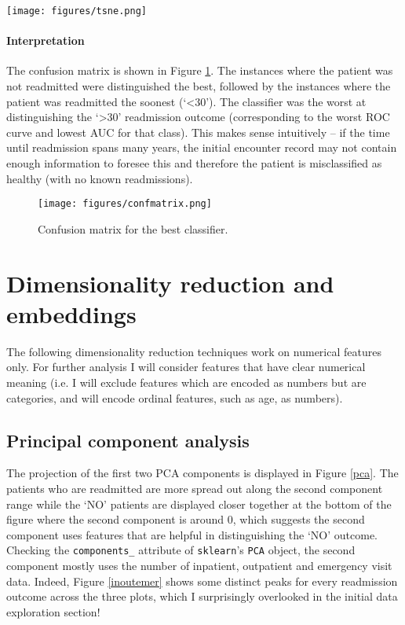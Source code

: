 \documentclass[10pt, twocolumn]{article}
\begin{document}
\begin{figure*}[b]
	\centering
	\texttt{[image: figures/tsne.png]}
	\caption{t-SNE embeddings of the diabetic patient dataset for selected perplexities.}\label{tsne}
  \end{figure*}

\paragraph{Interpretation} The confusion matrix is shown in Figure \ref{confmatrix}. The instances where the patient was not readmitted were distinguished the best, followed by the instances where the patient was readmitted the soonest (‘<30’). The classifier was the worst at distinguishing the ‘>30’ readmission outcome (corresponding to the worst ROC curve and lowest AUC for that class). This makes sense intuitively – if the time until readmission spans many years, the initial encounter record may not contain enough information to foresee this and therefore the patient is misclassified as healthy (with no known readmissions).

\begin{figure}[htb!]
	\centering
	\texttt{[image: figures/confmatrix.png]}
	\caption{Confusion matrix for the best classifier.}\label{confmatrix}
\end{figure}

\raggedbottom

\section{Dimensionality reduction and embeddings}
The following dimensionality reduction techniques work on numerical features only. For further analysis I will consider features that have clear numerical meaning (i.e. I will exclude features which are encoded as numbers but are categories, and will encode ordinal features, such as age, as numbers).


\subsection{Principal component analysis}

The projection of the first two PCA components is displayed in Figure \ref{pca}. The patients who are readmitted are more spread out along the second component range while the `NO' patients are displayed closer together at the bottom of the figure where the second component is around 0, which suggests the second component uses features that are helpful in distinguishing the `NO' outcome. Checking the \texttt{components\_} attribute of \texttt{sklearn}'s \texttt{PCA} object, the second component mostly uses the number of inpatient, outpatient and emergency visit data. Indeed, Figure \ref{inoutemer} shows some distinct peaks for every readmission outcome across the three plots, which I surprisingly overlooked in the initial data exploration section!
\end{document}
